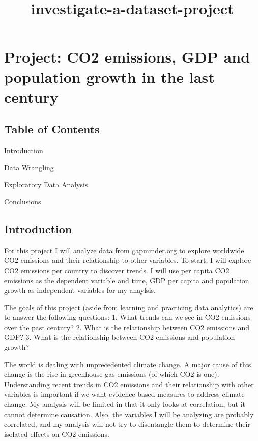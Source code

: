 \documentclass[11pt]{article}
\title{investigate-a-dataset-project}
\begin{document}
    
    
    \maketitle
    
    

    
    \hypertarget{project-co2-emissions-gdp-and-population-growth-in-the-last-century}{%
\section{Project: CO2 emissions, GDP and population growth in the last
century}\label{project-co2-emissions-gdp-and-population-growth-in-the-last-century}}

    \hypertarget{table-of-contents}{%
\subsection{Table of Contents}\label{table-of-contents}}

Introduction

Data Wrangling

Exploratory Data Analysis

Conclusions

    \hypertarget{introduction}{%
\subsection{Introduction}\label{introduction}}

For this project I will analyze data from
\href{https://www.gapminder.org/data/}{gapminder.org} to explore
worldwide CO2 emissions and their relationship to other variables. To
start, I will explore CO2 emissions per country to discover trends. I
will use per capita CO2 emissions as the dependent variable and time,
GDP per capita and population growth as independent variables for my
anaylsis.

The goals of this project (aside from learning and practicing data
analytics) are to answer the following questions: 1. What trends can we
see in CO2 emissions over the past century? 2. What is the relationship
between CO2 emissions and GDP? 3. What is the relationship between CO2
emissions and population growth?

The world is dealing with unprecedented climate change. A major cause of
this change is the rise in greenhouse gas emissions (of which CO2 is
one). Understanding recent trends in CO2 emissions and their
relationship with other variables is important if we want evidence-based
measures to address climate change. My analysis will be limited in that
it only looks at correlation, but it cannot determine causation. Also,
the variables I will be analyzing are probably correlated, and my
analysis will not try to disentangle them to determine their isolated
effects on CO2 emissions.
\end{document}
